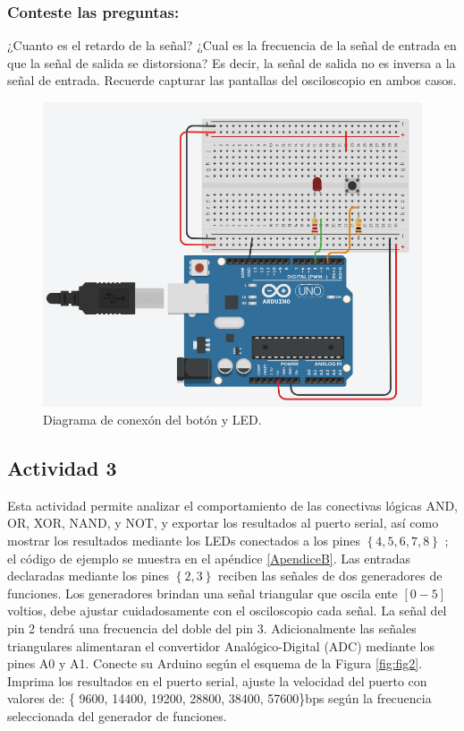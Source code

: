 \subsubsection{Conteste las preguntas:}
¿Cuanto es el retardo de la señal?
¿Cual es la frecuencia de la señal de entrada en que la señal de salida se distorsiona? Es decir, la señal de salida no es  inversa a la señal de entrada. Recuerde capturar las pantallas del osciloscopio en ambos casos.

\begin{figure}[H]
	\centering
	\includegraphics[width=0.5\linewidth]{fig/Fig1.png}
	\caption{Diagrama de conexón del botón y LED.}
	\label{fig:fig1}
\end{figure}


\subsection{Actividad 3}

Esta actividad permite analizar el comportamiento de las conectivas lógicas  AND, OR, XOR, NAND, y NOT, y exportar los resultados al puerto serial, así como mostrar los resultados mediante los LEDs conectados a los pines $\left\lbrace4, 5, 6, 7, 8 \right\rbrace$ ; el código de ejemplo se muestra en el apéndice \ref{ApendiceB}. Las entradas declaradas mediante los pines $\left\lbrace2, 3 \right\rbrace$ reciben las señales de dos generadores de funciones. Los generadores brindan una señal triangular que oscila ente $[0-5]$ voltios, debe ajustar cuidadosamente con el osciloscopio cada señal. La señal del pin 2 tendrá una frecuencia del doble del pin 3. Adicionalmente las señales  triangulares alimentaran el convertidor Analógico-Digital (ADC) mediante los pines A0 y A1. Conecte su Arduino según el esquema de la Figura \ref{fig:fig2}.  Imprima los resultados en el puerto serial, ajuste la velocidad del puerto con valores de: \{ 9600, 14400, 19200, 28800, 38400, 57600\}bps según la frecuencia seleccionada del generador de funciones.

